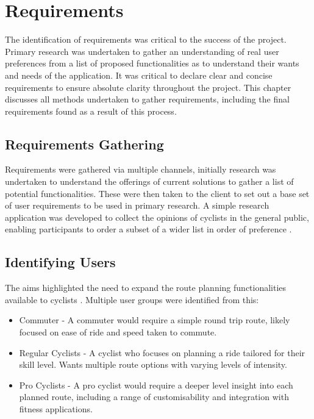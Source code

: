 \chapter{Requirements}
\label{chap:requirements}

The identification of requirements was critical to the success of the project. Primary research was undertaken to gather an understanding of real user preferences from a list of proposed functionalities as to understand their wants and needs of the application. It was critical to declare clear and concise requirements to ensure absolute clarity throughout the project. This chapter discusses all methods undertaken to gather requirements, including the final requirements found as a result of this process.

\section{Requirements Gathering}
\label{requirements:gathering}

Requirements were gathered via multiple channels, initially research was undertaken to understand the offerings of current solutions to gather a list of potential functionalities. These were then taken to the client to set out a base set of user requirements to be used in primary research. A simple research application was developed to collect the opinions of cyclists in the general public, enabling participants to order a subset of a wider list in order of preference .

\section{Identifying Users}
\label{requirements:identifyingusers}

The aims highlighted the need to expand the route planning functionalities available to cyclists . Multiple user groups were identified from this:
\begin{itemize}
  \item Commuter - A commuter would require a simple round trip route, likely focused on ease of ride and speed taken to commute.
  \item Regular Cyclists - A cyclist who focuses on planning a ride tailored for their skill level. Wants multiple route options with varying levels of intensity.
  \item Pro Cyclists - A pro cyclist would require a deeper level insight into each planned route, including a range of customisability and integration with fitness applications.
\end{itemize}


